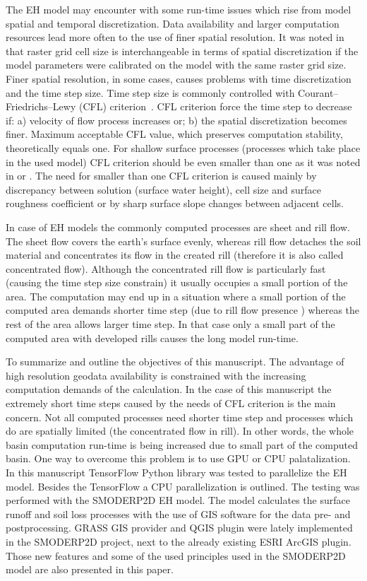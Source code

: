 The EH model may encounter with some run-time issues which 
rise from model spatial and temporal discretization. 
Data availability and larger computation resources lead more often 
to the use of finer spatial resolution. 
It was noted in \cite{molnar2000} that raster grid cell size is interchangeable 
in terms of spatial discretization if the model parameters 
were calibrated on the model with the same raster grid size. 
Finer spatial resolution, in some 
cases, causes problems with time discretization and the time step size. 
Time step size is commonly 
controlled with Courant–Friedrichs–Lewy (CFL) criterion~\cite{courant1928}. 
CFL criterion force the time step to decrease if: a) velocity of flow 
process increases or; b) the spatial discretization becomes finer. 
Maximum acceptable CFL value, which preserves computation stability, theoretically equals one. 
For shallow surface processes (processes which take place in the used model)
CFL criterion should 
be even smaller than one as it was noted in \cite{zhang1989}
or \cite{esteves2000}. The need for smaller than one CFL criterion 
is caused mainly by discrepancy between solution (surface water height), 
cell size and surface roughness coefficient 
or by sharp surface slope changes between adjacent cells. 

In case of EH models the commonly computed processes are sheet 
and 
rill flow. 
The sheet flow covers the earth's surface evenly, whereas rill flow detaches 
the soil material and concentrates its flow in the created rill 
(therefore it is also called concentrated flow).
Although the concentrated rill flow is particularly fast (causing  
the time step size constrain) it usually occupies a small portion of the area. 
The computation may end up in a situation where a 
small portion of the computed area demands shorter time step 
(due to rill flow presence ) whereas the rest of the area allows larger time step. 
In that case only a small part of the computed area with developed rills causes the long model run-time. 

To summarize and outline the objectives of this manuscript. The advantage of high 
resolution geodata availability is constrained with the increasing computation demands
of the calculation. In the case of this manuscript the extremely 
short time steps caused by the needs of CFL criterion is the main concern. 
Not all computed processes need shorter time step and processes which do are spatially limited (the concentrated flow in rill). 
In other words, 
the whole basin computation run-time is being increased due to small part
of the computed basin. One way to overcome this problem is to use 
GPU or CPU palatalization. In this manuscript TensorFlow Python library 
\cite{tensorflow2015-whitepaper} was tested to parallelize the EH model. 
Besides the TensorFlow a CPU parallelization is outlined. 
The testing was performed with the SMODERP2D EH model. The model calculates the surface runoff
and soil loss processes with the use of GIS software for the data pre- and postprocessing. 
GRASS GIS provider and QGIS plugin were lately implemented in the SMODERP2D project, next to the already existing ESRI ArcGIS plugin. 
Those new features and some of the used principles used in the SMODERP2D model are also presented in this paper. 

